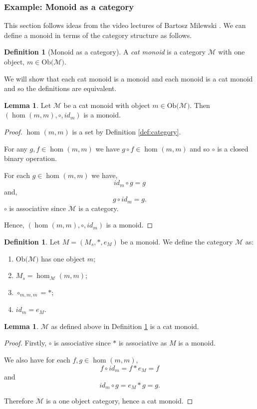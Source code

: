 \documentclass[11pt,a4paper]{article}
\theoremstyle{definition}
\newtheorem{lemma}[thm]{Lemma}
\newtheorem{definition}[thm]{Definition}
\newcommand\ho[3][]{\hom_{#1}(#2,#3)}
\newcommand\ob[1]{\mathrm{Ob(}#1\mathrm{)}}
\newcommand\cat[1]{\mathscr{#1}}
\numberwithin{equation}{section}
\begin{document}
\subsubsection{Example: Monoid as a category}
\label{sss:monascat}
This section follows ideas from the video lectures of Bartosz Milewski \cite{Bartosz}.
We can define a monoid in terms of the category structure as follows.
\begin{definition}[Monoid as a category]
\label{def:catmon}
    A \emph{cat monoid} is a category $\cat{M}$ with one object, $m\in\ob{\cat{M}}$.
\end{definition}
We will show that each cat monoid is a monoid and each monoid is a cat monoid and so the definitions are equivalent.
\begin{lemma}
    \label{lem:moniscat}
    Let $\cat{M}$ be a cat monoid with object $m\in\ob{\cat{M}}$. Then $(\ho{m}{m},\circ,id_{m})$ is a monoid.
\end{lemma}
\begin{proof}
    $\ho{m}{m}$ is a set by Definition \ref{def:category}. 
    
    For any $g,f\in\ho{m}{m}$ we have $g\circ f\in\ho{m}{m}$ and so $\circ$ is a closed binary operation. 
    
    For each $g\in\ho{m}{m}$ we have, \[id_{m}\circ g = g\] and, \[g\circ id_{m} = g.\] $\circ$ is associative since $\cat{M}$ is a category. 
    
    Hence, $(\ho{m}{m},\circ,id_{m})$ is a monoid.
\end{proof}
\begin{definition}
\label{def:monascatmon}
    Let $M = (M_{s},*,e_{M})$ be a monoid. We define the category $\cat{M}$ as:
    \begin{enumerate}
        \item $\ob{\cat{M}}$ has one object $m$;
        \item $M_{s}=\ho[\cat{M}]{m}{m}$;
        \item $\circ_{m,m,m} = *$;
        \item $id_{m} = e_{M}$.
    \end{enumerate}
\end{definition}
\begin{lemma}
    \label{lem:moncatismon}
    $\cat{M}$ as defined above in Definition \ref{def:monascatmon} is a cat monoid.
\end{lemma}
\begin{proof}
    Firstly, $\circ$ is associative since $*$ is associative as $M$ is a monoid. 
    
    We also have for each $f,g\in\ho{m}{m}$, \[f\circ id_{m} = f*e_{M} = f\] and \[id_{m}\circ g = e_{M}*g = g.\] 
    
    Therefore $\cat{M}$ is a one object category, hence a cat monoid.
\end{proof}
\end{document}
